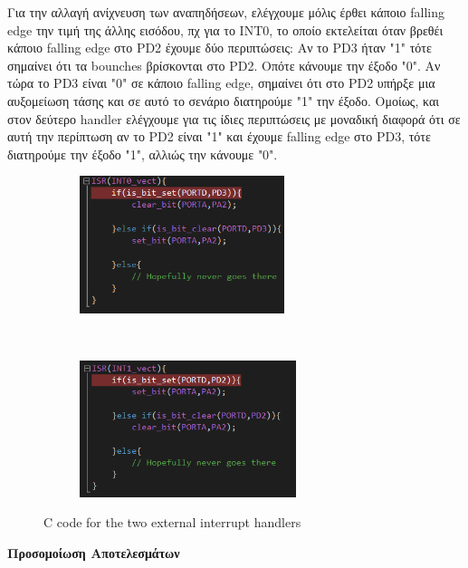 \documentclass{article}
\begin{document}
	\noindent
	Για την αλλαγή ανίχνευση των αναπηδήσεων, ελέγχουμε μόλις έρθει κάποιο falling edge την τιμή της άλλης εισόδου, πχ για το INT0, το οποίο εκτελείται όταν βρεθέι κάποιο falling edge στο PD2 έχουμε δύο περιπτώσεις: Αν το PD3 ήταν "1" τότε σημαίνει ότι τα bounches βρίσκονται στο PD2. Οπότε κάνουμε την έξοδο "0". Αν τώρα το PD3 είναι "0" σε κάποιο falling edge, σημαίνει ότι στο PD2 υπήρξε μια αυξομείωση τάσης και σε αυτό το σενάριο διατηρούμε "1" την έξοδο. Ομοίως, και στον δεύτερο handler ελέγχουμε για τις ίδιες περιπτώσεις με μοναδική διαφορά ότι σε αυτή την περίπτωση αν το PD2 είναι "1" και έχουμε falling edge στο PD3, τότε διατηρούμε την έξοδο "1", αλλιώς την κάνουμε "0". 
	\begin{figure}[h!]
		\centering
		\begin{subfigure}[t]{0.5\textwidth}
			\centering
			\includegraphics[height=4cm, width=\linewidth]{./results/lab9_int0_b.png}
		\end{subfigure}%
		~
		\begin{subfigure}[t]{0.5\textwidth}
			\centering
			\includegraphics[height=4cm, width=\linewidth]{./results/lab9_int1_b.png}
		\end{subfigure}
		\caption{C code for the two external interrupt handlers}
	\end{figure}
	
	\noindent
	\textbf{Προσομοίωση Αποτελεσμάτων} \\
	\noindent
	
\end{document}
